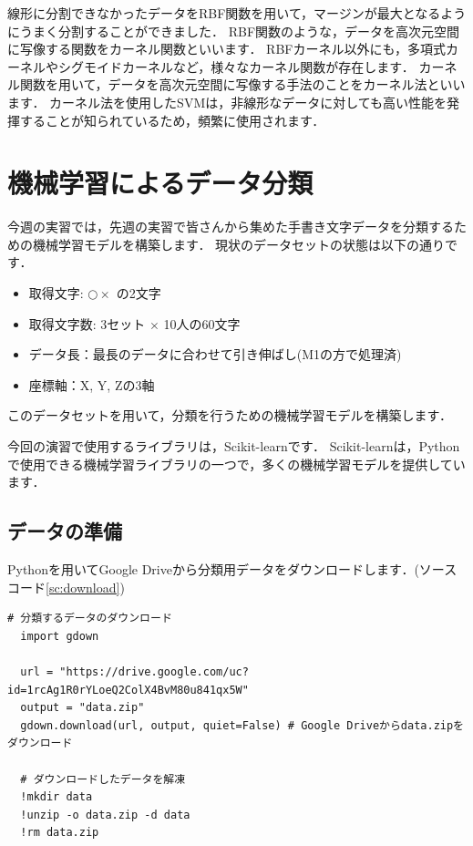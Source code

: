 \documentclass{jarticle}
\begin{document}
線形に分割できなかったデータをRBF関数を用いて，マージンが最大となるようにうまく分割することができました．
RBF関数のような，データを高次元空間に写像する関数をカーネル関数といいます．
RBFカーネル以外にも，多項式カーネルやシグモイドカーネルなど，様々なカーネル関数が存在します．
カーネル関数を用いて，データを高次元空間に写像する手法のことをカーネル法といいます．
カーネル法を使用したSVMは，非線形なデータに対しても高い性能を発揮することが知られているため，頻繁に使用されます．


\section{機械学習によるデータ分類}
今週の実習では，先週の実習で皆さんから集めた手書き文字データを分類するための機械学習モデルを構築します．
現状のデータセットの状態は以下の通りです．

\begin{itemize}
  \item 取得文字: $ \bigcirc  \times $ の2文字
  \item 取得文字数: 3セット $ \times $ 10人の60文字
  \item データ長：最長のデータに合わせて引き伸ばし(M1の方で処理済)
  \item 座標軸：X, Y, Zの3軸
\end{itemize}

このデータセットを用いて，分類を行うための機械学習モデルを構築します．

今回の演習で使用するライブラリは，Scikit-learnです．
Scikit-learnは，Pythonで使用できる機械学習ライブラリの一つで，多くの機械学習モデルを提供しています．


\subsection{データの準備}
Pythonを用いてGoogle Driveから分類用データをダウンロードします．(ソースコード\ref{sc:download})

\begin{lstlisting}[caption=データのダウンロード, label=sc:download]
  # 分類するデータのダウンロード
  import gdown

  url = "https://drive.google.com/uc?id=1rcAg1R0rYLoeQ2ColX4BvM80u841qx5W"
  output = "data.zip"
  gdown.download(url, output, quiet=False) # Google Driveからdata.zipをダウンロード

  # ダウンロードしたデータを解凍
  !mkdir data
  !unzip -o data.zip -d data
  !rm data.zip
\end{lstlisting}
\end{document}
